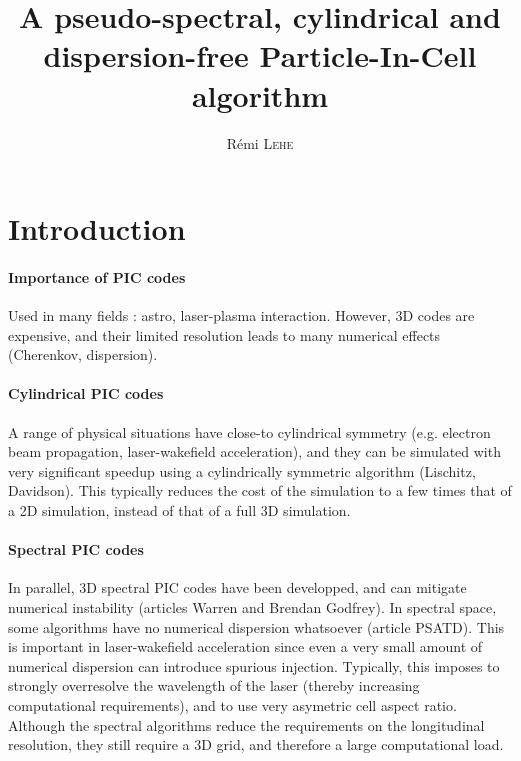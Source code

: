 \documentclass[a4paper]{article}   	%
\title{A pseudo-spectral, cylindrical and dispersion-free Particle-In-Cell algorithm}
\date{}
\author{R\'emi \textsc{Lehe}}
\begin{document}
\maketitle


\section*{Introduction}

\paragraph{Importance of PIC codes } Used in many fields : astro, laser-plasma interaction. However, 3D codes are expensive, and their limited resolution leads to many numerical effects (Cherenkov, dispersion).

\paragraph{Cylindrical PIC codes} A range of physical situations have close-to cylindrical symmetry (e.g. electron beam propagation, laser-wakefield acceleration), and they can be simulated with very significant speedup using a cylindrically symmetric algorithm (Lischitz, Davidson). This typically reduces the cost of the simulation to a few times that of a 2D simulation, instead of that of a full 3D simulation.

\paragraph{Spectral PIC codes} In parallel, 3D spectral PIC codes have been developped, and can mitigate numerical instability (articles Warren and Brendan Godfrey). In spectral space, some algorithms have no numerical dispersion whatsoever (article PSATD). This is important in laser-wakefield acceleration since even a very small amount of numerical dispersion can introduce spurious injection. Typically, this imposes to strongly overresolve the wavelength of the laser (thereby increasing computational requirements), and to use very asymetric cell aspect ratio. Although the spectral algorithms reduce the requirements on the longitudinal resolution, they still require a 3D grid, and therefore a large computational load.
\end{document}
